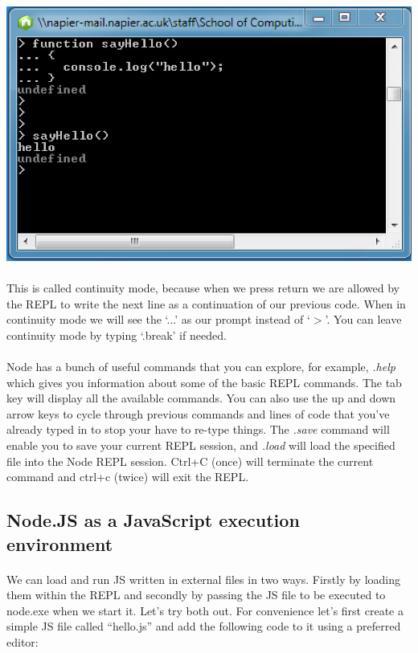 \documentclass[10pt, a4paper, twosize]{article}
\begin{document}
\includegraphics[width=.8\textwidth]{images/node_repl-multi-line}

\paragraph{} This is called continuity mode, because when we press return we are allowed by the REPL to write the next line as a continuation of our previous code. When in continuity mode we will see the `...' as our prompt instead of `$>$'. You can leave continuity mode by typing `.break' if needed.

\paragraph{} Node has a bunch of useful commands that you can explore, for example, \emph{.help} which gives you information about some of the basic REPL commands. The tab key will display all the available commands. You can also use the up and down arrow keys to cycle through previous commands and lines of code that you've already typed in to stop your have to re-type things. The \emph{.save} command will enable you to save your current REPL session, and \emph{.load} will load the specified file into the Node REPL session. Ctrl+C (once) will terminate the current command and ctrl+c (twice) will exit the REPL.


\subsection{Node.JS as a JavaScript execution environment}
\paragraph{} We can load and run JS written in external files in two ways. Firstly by loading them within the REPL and secondly by passing the JS file to be executed to node.exe when we start it. Let's try both out. For convenience let's first create a simple JS file called ``hello.js'' and add the following code to it using a preferred editor:
\end{document}
